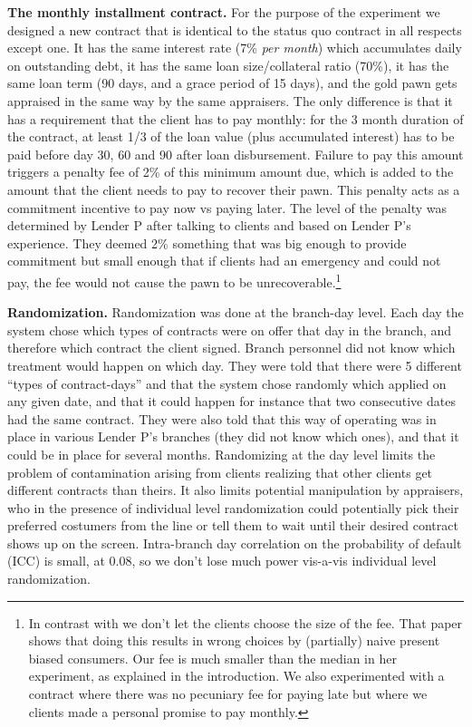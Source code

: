 \documentclass[oneside,11pt]{article}
\begin{document}
\vspace{.2in}
\noindent \textbf{The monthly installment contract.} For the purpose of the experiment we designed a new contract that is identical to the status quo contract in all respects except one. It has the same interest rate (7\% \textit{per month}) which accumulates daily on outstanding debt, it has the same loan size/collateral ratio (70\%), it has the same loan term (90 days, and a grace period of 15 days), and the gold pawn gets appraised in the same way by the same appraisers. The only difference is that it has a requirement that the client has to pay monthly: for the 3 month duration of the contract, at least 1/3 of the loan value (plus accumulated interest) has to be paid before day 30, 60 and 90 after loan disbursement. Failure to pay this amount triggers a penalty fee of 2\% of this minimum amount due, which is added to the amount that the client needs to pay to recover their pawn. This penalty acts as a commitment incentive to pay now vs paying later. The level of the penalty was determined by Lender P after talking to clients and based on Lender P's experience. They deemed 2\% something that was big enough to provide commitment but small enough that if clients had an emergency and could not pay, the fee would not cause the pawn to be unrecoverable.\footnote{In contrast with \cite{John} we don't let the clients choose the size of the fee. That paper shows that doing this results in wrong choices by (partially) naive present biased consumers. Our fee is much smaller than the median in her experiment, as explained in the introduction. We also experimented with a contract where there was no pecuniary fee for paying late but where we clients made a personal promise to pay monthly.}

\vspace{.2in}
\noindent \textbf{Randomization.} Randomization was done at the branch-day level.  Each day the system chose which types of contracts were on offer that day in the branch, and therefore which contract the client signed. Branch personnel did not know which treatment would happen on which day. They were told that there were 5 different ``types of contract-days'' and that the system chose randomly which applied on any given date, and that it could happen for instance that two consecutive dates had the same contract. They were also told that this way of operating was in place in various Lender P's branches (they did not know which ones), and that it could be in place for several months. Randomizing at the day level limits the problem of contamination arising from clients realizing that other clients get different contracts than theirs. It also limits potential manipulation by appraisers, who in the presence of individual level randomization could potentially pick their preferred costumers from the line or tell them to wait until their desired contract shows up on the screen. Intra-branch day correlation on the probability of default (ICC) is small, at {0.08}, so we don't lose much power vis-a-vis individual level randomization.
\end{document}
